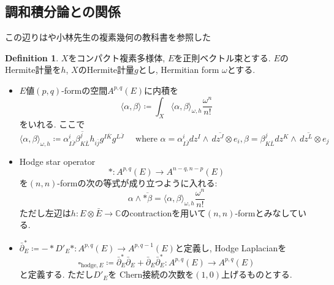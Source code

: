 \documentclass[dvipdfmx,a4paper,11pt]{article} %
\theoremstyle{definition}
\newtheorem{defn}[thm]{Definition}
\theoremstyle{remark}
\numberwithin{equation}{section}
\newcommand{\C}{\mathbb{C}}
\begin{document}
\subsection{調和積分論との関係}
\label{subsec-harmonic}
この辺りは\cite[Section 3]{Dem12}や小林先生の複素幾何の教科書を参照した
\begin{defn}
$X$をコンパクト複素多様体, $E$を正則ベクトル束とする. 
$E$のHermite計量を$h$, $X$のHermite計量$g$とし, Hermitian form $\omega$とする. 
\begin{itemize}
\item $E$値$(p,q)$-formの空間$A^{p,q}(E) $に内積を
\[
\langle \alpha, \beta \rangle\coloneqq 
\int_{X} 
\langle \alpha, \beta \rangle_{\omega, h}\frac{\omega^{n}}{n!}
\]
をいれる. 
ここで
\[
\langle \alpha, \beta \rangle_{\omega, h}
\coloneqq  \alpha_{I\overline{J}}^{i}\overline{\beta_{K\overline{L}}^{j}}
h_{i \bar{j}} 
g^{I \overline{K}}
g^{L \overline{J}}
\quad \text{ where }
\alpha=\alpha_{I\overline{J}}^{i}dz^I \wedge\,d\overline{z^J} \otimes e_{i}, 
\beta=\beta_{K\overline{L}}^{j}dz^K \wedge\,d\overline{z^L} \otimes e_{j}
\]

\item Hodge star operator
\[
* \colon A^{p,q}(E)\to A^{n-q,n-p}(E) 
\]
を$(n,n)$-formの次の等式が成り立つように入れる:
\[
\alpha \wedge \overline{* \beta}
=\langle \alpha, \beta \rangle_{\omega, h}  \frac{\omega^{n}}{n!}
\]
ただし左辺は$h : E \otimes \bar{E} \to \C$のcontractionを用いて$(n,n)$-formとみなしている. 
\item $\bar\partial_E^{*}\coloneqq  - * D'_E* \colon A^{p,q}(E) \to A^{p,q-1}(E) $と定義し, 
Hodge Laplacianを
\[
\square_{\mathrm{hodge}, E} 
\coloneqq  \bar\partial_E^{*} \bar\partial_E +\bar\partial_E \bar\partial_E^{*} 
\colon A^{p,q}(E) \to A^{p,q}(E) 
\]
と定義する. ただし$D'_E$を
Chern接続の次数を$(1,0)$上げるものとする. 
\end{itemize}
\end{defn}
\end{document}
